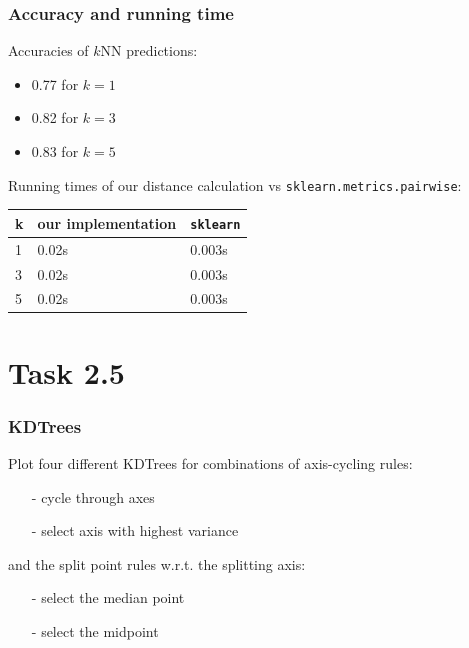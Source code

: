 \documentclass{beamer}
\begin{document}
\begin{frame}
\frametitle{Accuracy and running time}
Accuracies of $k$NN predictions:
	\begin{itemize}
		\item 0.77 for $k=1$
		\item 0.82 for $k=3$
		\item 0.83 for $k=5$
	\end{itemize}

Running times of our distance calculation vs \texttt{sklearn.metrics.pairwise}:
\begin{table}[]
	\centering
	\label{my-label}
	\begin{tabular}{l|l|l}
		k & our implementation &  \texttt{sklearn}\\ \hline
		1    & 0.02s & 0.003s \\ \hline
		3    & 0.02s & 0.003s \\ \hline
		5    & 0.02s & 0.003s \\ 
	\end{tabular}
\end{table}

\end{frame}

\section{Task 2.5}
\begin{frame}
	\frametitle{KDTrees}
	Plot four different KDTrees for combinations of  axis-cycling rules:
	\begin{itemize}
		\item[-] cycle through axes
		\item[-] select axis with highest variance
	\end{itemize}
	and the split point  rules w.r.t. the splitting axis:
	\begin{itemize}
		\item[-] select the median point
		\item[-] select the midpoint
	\end{itemize}
\end{frame}
\end{document}
